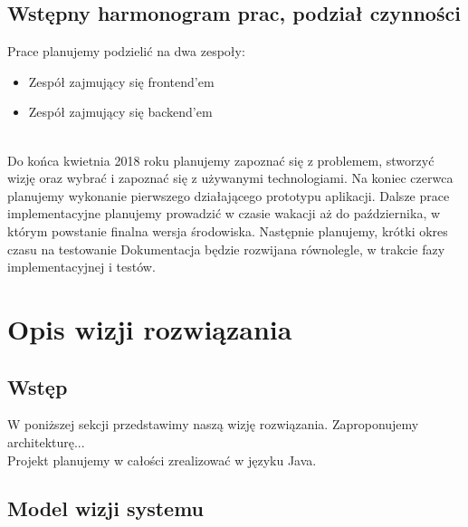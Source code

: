 \documentclass[12pt,a4paper]{report}
\begin{document}


\subsection{Wstępny harmonogram prac, podział czynności}

Prace planujemy podzielić na dwa zespoły:
\begin{itemize}
\item Zespół zajmujący się frontend'em
\item Zespół zajmujący się backend'em
\end{itemize}~\\

Do końca kwietnia 2018 roku planujemy zapoznać się z problemem, stworzyć wizję oraz wybrać i zapoznać się z używanymi technologiami. Na koniec czerwca planujemy wykonanie pierwszego działającego prototypu aplikacji. Dalsze prace implementacyjne planujemy prowadzić w czasie wakacji aż do października, w którym powstanie finalna wersja środowiska. Następnie planujemy, krótki okres czasu na testowanie  Dokumentacja będzie rozwijana równolegle, w trakcie fazy implementacyjnej i testów.

\newpage
\section{Opis wizji rozwiązania}

\subsection{Wstęp}

W poniższej sekcji przedstawimy naszą wizję rozwiązania. Zaproponujemy architekturę...\\
Projekt planujemy w całości zrealizować w języku Java.


\subsection{Model wizji systemu}
\end{document}
